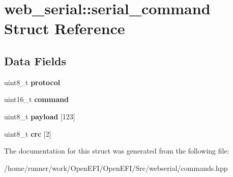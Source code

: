 \hypertarget{structweb__serial_1_1serial__command}{}\section{web\+\_\+serial\+:\+:serial\+\_\+command Struct Reference}
\label{structweb__serial_1_1serial__command}
\subsection*{Data Fields}
\begin{DoxyCompactItemize}
\item 
\mbox{\label{structweb__serial_1_1serial__command_ac4416bc0d0cc1d325beeb0729ab019f6}} 
uint8\+\_\+t {\bfseries protocol}
\item 
\mbox{\label{structweb__serial_1_1serial__command_a752acd0ca70a89a66bc86aab140657fe}} 
uint16\+\_\+t {\bfseries command}
\item 
\mbox{\label{structweb__serial_1_1serial__command_ad19f09253d9c44ebeec74da88137496d}} 
uint8\+\_\+t {\bfseries payload} \mbox{[}123\mbox{]}
\item 
\mbox{\label{structweb__serial_1_1serial__command_a4230269eee1bba2b5637a25efb253aa1}} 
uint8\+\_\+t {\bfseries crc} \mbox{[}2\mbox{]}
\end{DoxyCompactItemize}


The documentation for this struct was generated from the following file\+:\begin{DoxyCompactItemize}
\item 
/home/runner/work/\+Open\+E\+F\+I/\+Open\+E\+F\+I/\+Src/webserial/commands.\+hpp\end{DoxyCompactItemize}
